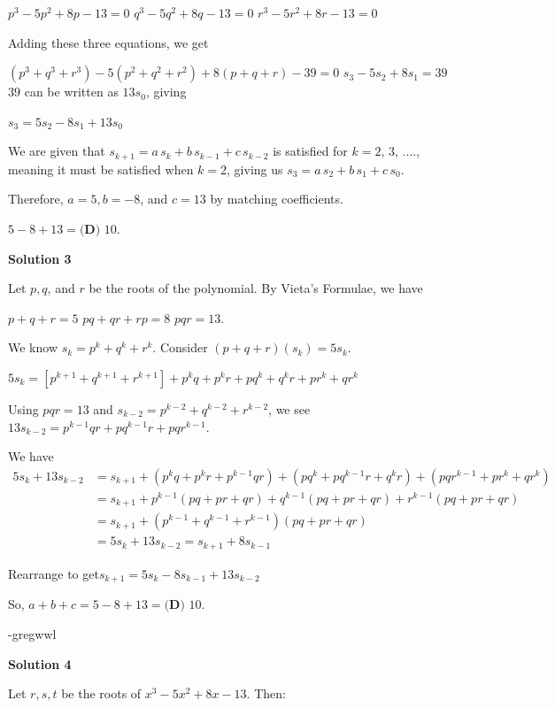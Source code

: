 \begin{enumerate}
 $p^3 - 5p^2 + 8p - 13 = 0$
$q^3 - 5q^2 + 8q - 13 = 0$
$r^3 - 5r^2 + 8r - 13 = 0$

 Adding these three equations, we get

 $(p^3 + q^3 + r^3) - 5(p^2 + q^2 + r^2) + 8(p + q + r) - 39 = 0$
$s_3 - 5s_2 + 8s_1 = 39$
$39$ can be written as $13s_0$, giving

 $s_3 = 5s_2 - 8s_1 + 13s_0$

 We are given that $s_{k+1} = a \, s_k + b \, s_{k-1} + c \, s_{k-2}$ is satisfied for $k = 2$, $3$, $....$, meaning it must be satisfied when $k = 2$, giving us $s_3 = a \, s_2 + b \, s_1 + c \, s_0$.

 Therefore, $a = 5, b = -8$, and $c = 13$ by matching coefficients.

 $5 - 8 + 13 = \boxed{\textbf{(D) } 10}$.

 



\textbf{Solution 3}

Let $p, q$, and $r$ be the roots of the polynomial. By Vieta's Formulae, we have

 $p+q+r = 5$
$pq+qr+rp = 8$
$pqr=13$.

 We know $s_k = p^k + q^k + r^k$. Consider $(p+q+r)(s_k) =5s_k$.

 $5s_k = [p^{k+1} + q^{k+1} + r^{k+1}] + p^k q + p^k r + pq^k + q^k r + pr^k + qr^k$

 Using $pqr = 13$ and $s_{k-2} = p^{k-2} + q^{k-2} + r^{k-2}$, we see$13s_{k-2} = p^{k-1}qr + pq^{k-1}r + pqr^{k-1}$.

 We have 
 \[\begin{split} 5s_k + 13s_{k-2} &= s_{k+1} + (p^k q + p^k r + p^{k-1}qr) + (pq^k + pq^{k-1}r + q^k r) + (pqr^{k-1} + pr^k + qr^k) \\ &= s_{k+1} + p^{k-1} (pq + pr + qr) + q^{k-1} (pq + pr + qr) + r^{k-1} (pq + pr + qr) \\ &= s_{k+1} + (p^{k-1} + q^{k-1} + r^{k-1})(pq + pr + qr) \\ &= 5s_k + 13s_{k-2} = s_{k+1} + 8s_{k-1}\end{split}\]

 Rearrange to get$s_{k+1} = 5s_k - 8s_{k-1} + 13s_{k-2}$

 So, $a+ b + c = 5 -8 + 13 = \boxed{\textbf{(D) } 10}$.

 -gregwwl

 



\textbf{Solution 4}

Let $r,s,t$ be the roots of $x^3-5x^2+8x-13$. Then:


\end{enumerate}
